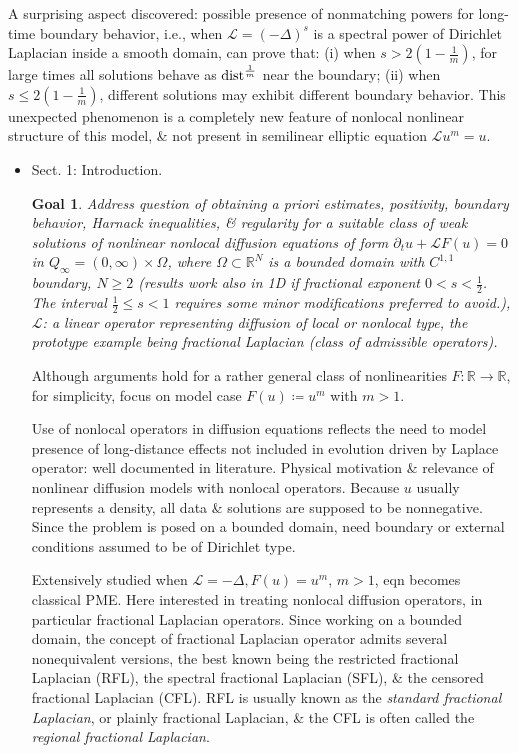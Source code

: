 \documentclass{article}
\newtheorem{goal}{Goal}
\begin{document}
\begin{enumerate}
	A surprising aspect discovered: possible presence of nonmatching powers for long-time boundary behavior, i.e., when $\mathcal{L} = (-\Delta)^s$ is a spectral power of Dirichlet Laplacian inside a smooth domain, can prove that: (i) when $s > 2\left(1 - \frac{1}{m}\right)$, for large times all solutions behave as ${\rm dist}^{\frac{1}{m}}$ near the boundary; (ii) when $s\le2\left(1 - \frac{1}{m}\right)$, different solutions may exhibit different boundary behavior. This unexpected phenomenon is a completely new feature of nonlocal nonlinear structure of this model, \& not present in semilinear elliptic equation $\mathcal{L}u^m = u$.
	\begin{itemize}
		\item {\sf Sect. 1: Introduction.}
		\begin{goal}
			Address question of obtaining a priori estimates, positivity, boundary behavior, Harnack inequalities, \& regularity for a suitable class of weak solutions of nonlinear nonlocal diffusion equations of form $\partial_tu + \mathcal{L}F(u) = 0$ in $Q_\infty = (0,\infty)\times\Omega$, where $\Omega\subset\mathbb{R}^N$ is a bounded domain with $C^{1,1}$ boundary, $N\ge2$ (results work also in 1D if fractional exponent $0 < s <\frac{1}{2}$. The interval $\frac{1}{2}\le s < 1$ requires some minor modifications preferred to avoid.), $\mathcal{L}$: a linear operator representing diffusion of local or nonlocal type, the prototype example being fractional Laplacian (class of admissible operators).
		\end{goal}
		Although arguments hold for a rather general class of nonlinearities $F:\mathbb{R}\to\mathbb{R}$, for simplicity, focus on model case $F(u)\coloneqq u^m$ with $m > 1$.
		
		Use of nonlocal operators in diffusion equations reflects the need to model presence of long-distance effects not included in evolution driven by Laplace operator: well documented in literature. Physical motivation \& relevance of nonlinear diffusion models with nonlocal operators. Because $u$ usually represents a density, all data \& solutions are supposed to be nonnegative. Since the problem is posed on a bounded domain, need boundary or external conditions assumed to be of Dirichlet type.
		
		Extensively studied when $\mathcal{L} = -\Delta,F(u) = u^m$, $m > 1$, eqn becomes classical PME. Here interested in treating nonlocal diffusion operators, in particular fractional Laplacian operators. Since working on a bounded domain, the concept of fractional Laplacian operator admits several nonequivalent versions, the best known being the restricted fractional Laplacian (RFL), the spectral fractional Laplacian (SFL), \& the censored fractional Laplacian (CFL). RFL is usually known as the {\it standard fractional Laplacian}, or plainly fractional Laplacian, \& the CFL is often called the {\it regional fractional Laplacian}.
		

\end{itemize}
\end{enumerate}
\end{document}
